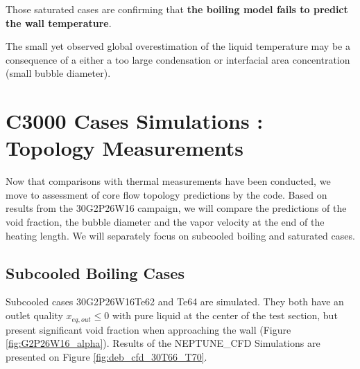 \npar

Those saturated cases are confirming that \textbf{the boiling model fails to predict the wall temperature}. 


\begin{remark*}{}
The small yet observed global overestimation of the liquid temperature may be a consequence of a either a too large condensation or interfacial area concentration (\ie small bubble diameter). 
\end{remark*}




\section{C3000 Cases Simulations : Topology Measurements}
\label{sec:deb_cfd_c30}

Now that comparisons with thermal measurements have been conducted, we move to assessment of core flow topology predictions by the code. Based on results from the 30G2P26W16 campaign, we will compare the predictions of the void fraction, the bubble diameter and the vapor velocity at the end of the heating length. We will separately focus on subcooled boiling and saturated cases.


\subsection{Subcooled Boiling Cases}

Subcooled cases 30G2P26W16Te62 and Te64 are simulated. They both have an outlet quality $x_{eq,out} \leq 0$ with pure liquid at the center of the test section, but present significant void fraction when approaching the wall (Figure \ref{fig:G2P26W16_alpha}). Results of the NEPTUNE\_CFD Simulations are presented on Figure \ref{fig:deb_cfd_30T66_T70}.

